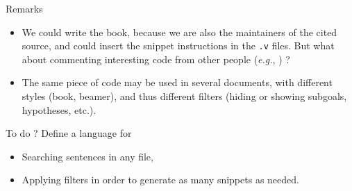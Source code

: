 \documentclass[10pt, fleqn]{beamer}
\begin{document}

\begin{frame}
    
  \begin{block}{Remarks}
    \begin{itemize}
    \item We could write the book, because we are also the maintainers of the cited \coq source, and could insert the snippet instructions in the \texttt{.v} files. \textcolor{lookcolor}{But what about commenting interesting code from other people (\emph{e.g.},
        \gaia) ?}
    \item The same  piece of \coq code may be used in several documents, with different styles (book, beamer), and thus
      different filters (hiding or showing subgoals, hypotheses, etc.).
      
    \end{itemize}
  \end{block}

  \begin{block}{To do ?}
    Define a language for
    \begin{itemize}
    \item Searching sentences in any \coq file,
    \item Applying filters in order to generate as many snippets as needed.
    \end{itemize}
  \end{block}
\end{frame}




  

\end{document}
